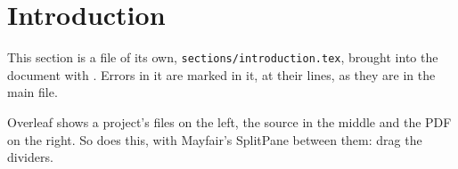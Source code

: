 \section{Introduction}
\label{sec:introduction}

This section is a file of its own, \texttt{sections/introduction.tex}, brought into the
document with \verb||. Errors in it are marked in it, at their lines, as they are in
the main file.

Overleaf shows a project's files on the left, the source in the middle and the PDF on the
right. So does this, with Mayfair's SplitPane between them: drag the dividers.
